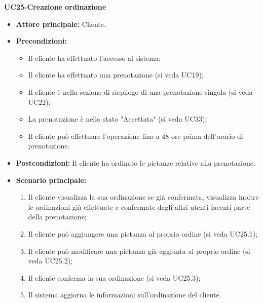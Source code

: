 \textbf{UC25-Creazione ordinazione}
\begin{itemize}
\item \textbf{Attore principale:} Cliente.
\item \textbf{Precondizioni:} 
\begin{itemize}
    \item Il cliente ha effettuato l'accesso al sistema;
    \item Il cliente ha effettuato una prenotazione (si veda UC19);
    \item Il cliente è nella sezione di riepilogo di una prenotazione singola (si veda UC22);
    \item La prenotazione è nello stato "Accettata" (si veda UC33);
    \item Il cliente può effettuare l'operazione fino a 48 ore prima dell'orario di prenotazione.
\end{itemize}
\item \textbf{Postcondizioni:} Il cliente ha ordinato le pietanze relative alla prenotazione.
\item \textbf{Scenario principale:}
\begin{enumerate}
    \item Il cliente visualizza la sua ordinazione se già confermata, visualizza inoltre le ordinazioni già effettuate e confermate dagli altri utenti facenti parte della prenotazione;
    \item Il cliente può aggiungere una pietanza al proprio ordine (si veda UC25.1);
    \item Il cliente può modificare una pietanza già aggiunta al proprio ordine (si veda UC25.2);
    \item Il cliente conferma la sua ordinazione (si veda UC25.3);
    \item Il sistema aggiorna le informazioni sull'ordinazione del cliente.
\end{enumerate}
\end{itemize}

